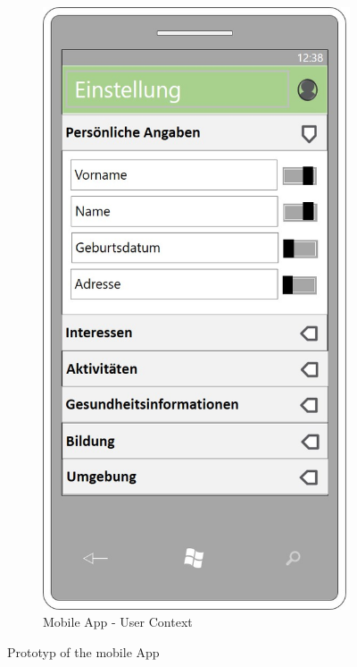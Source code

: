 \begin{figure}[!ht]
\begin{subfigure}{0.32\linewidth}
		\centering
		\includegraphics[width=1\linewidth]{Picture/App-Kontext}
		\caption{Mobile App - User Context}
		\label{fig:prototyp3}
	\end{subfigure}%
	\caption{Prototyp of the mobile App}
	\label{fig:prototyp}
\end{figure}











